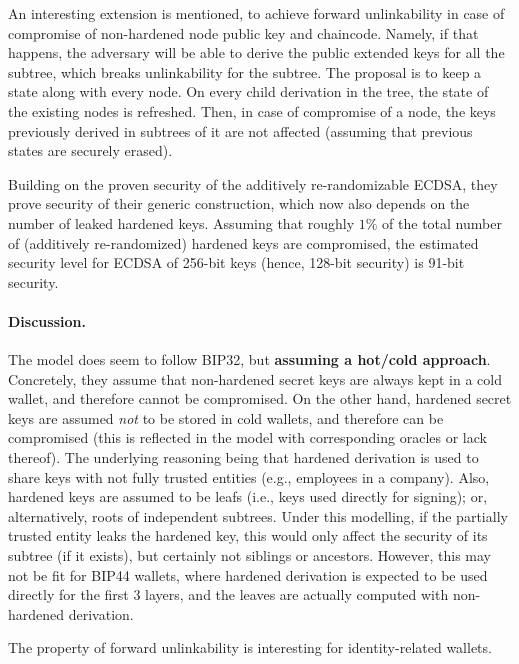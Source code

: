 An interesting extension is mentioned, to achieve forward unlinkability in case
of compromise of non-hardened node public key and chaincode. Namely, if that
happens, the adversary will be able to derive the public extended keys for
all the subtree, which breaks unlinkability for the subtree. The proposal is to
keep a state along with every node. On every child derivation in the tree, the
state of the existing nodes is refreshed. Then, in case of compromise of a
node, the keys previously derived in subtrees of it are not affected (assuming
that previous states are securely erased).

Building on the proven security of the additively re-randomizable ECDSA, they
prove security of their generic construction, which now also depends on the
number of leaked hardened keys. Assuming that roughly $1\%$ of the total number
of (additively re-randomized) hardened keys are compromised, the estimated
security level for ECDSA of 256-bit keys (hence, 128-bit security) is 91-bit
security.

\paragraph{Discussion.} %
The model does seem to follow BIP32, but \textbf{assuming a hot/cold approach}.
Concretely, they assume that non-hardened secret keys are always kept in a cold
wallet, and therefore cannot be compromised. On the other hand, hardened secret
keys are assumed \emph{not} to be stored in cold wallets, and therefore can be
compromised (this is reflected in the model with corresponding oracles or lack
thereof). The underlying reasoning being that hardened derivation is used to
share keys with not fully trusted entities (e.g., employees in a company). Also,
hardened keys are assumed to be leafs (i.e., keys used directly for signing); or,
alternatively, roots of independent subtrees. Under this modelling, if the
partially trusted entity leaks the hardened key, this would only affect the
security of its subtree (if it exists), but certainly not siblings or ancestors.
However, this may not be fit for BIP44 wallets, where hardened derivation is
expected to be used directly for the first 3 layers, and the leaves are actually
computed with non-hardened derivation.

The property of forward unlinkability is interesting for identity-related
wallets.


